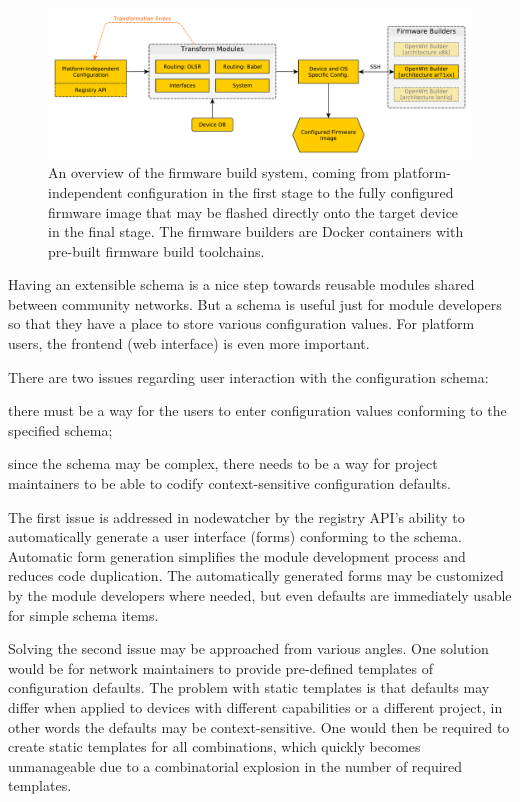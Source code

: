\documentclass[5p,sort&compress]{elsarticle}
\begin{document}
\begin{figure}
  \centering
  \includegraphics[scale=0.5]{figures/firmware-buildsystem.pdf}
  \caption{An overview of the firmware build system, coming from platform-independent configuration in the first stage to the fully configured firmware image that may be flashed directly onto the target device in the final stage.
The firmware builders are Docker containers with pre-built firmware build toolchains.}
  \label{fig:firmware-build-system}
\end{figure}

Having an extensible schema is a nice step towards reusable modules shared between community networks.
But a schema is useful just for module developers so that they have a place to store various configuration values.
For platform users, the frontend (web interface) is even more important.

There are two issues regarding user interaction with the configuration schema:
\begin{enumerate*}[label=\itshape\alph*\upshape)]
\item there must be a way for the users to enter configuration values conforming to the specified schema;
\item since the schema may be complex, there needs to be a way for project maintainers to be able to codify context-sensitive configuration defaults.
\end{enumerate*}
The first issue is addressed in nodewatcher by the registry API's ability to automatically generate a user interface (forms) conforming to the schema.
Automatic form generation simplifies the module development process and reduces code duplication.
The automatically generated forms may be customized by the module developers where needed, but even defaults are immediately usable for simple schema items.

Solving the second issue may be approached from various angles.
One solution would be for network maintainers to provide pre-defined templates of configuration defaults.
The problem with static templates is that defaults may differ when applied to devices with different capabilities or a different project, in other words the defaults may be context-sensitive.
One would then be required to create static templates for all combinations, which quickly becomes unmanageable due to a combinatorial explosion in the number of required templates.
\end{document}
